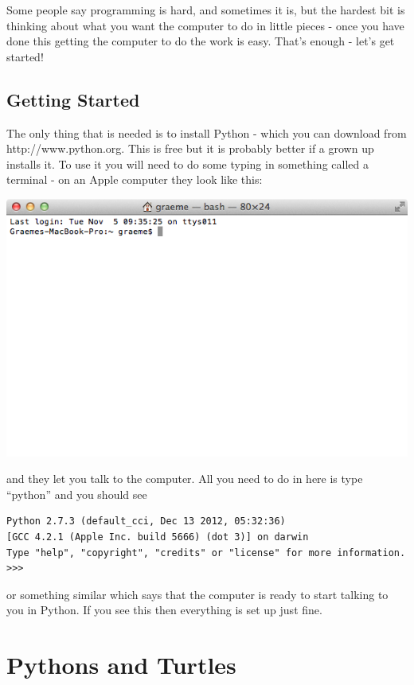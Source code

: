 \documentclass[a4paper, 11pt]{book}
\begin{document}
Some people say programming is hard, and sometimes it is, but the hardest bit is thinking about what you want the computer to do in little pieces - once you have done this getting the computer to do the work is easy. That's enough - let's get started!

\section{Getting Started}

The only thing that is needed is to install Python - which you can download from http://www.python.org. This is free but it is probably better if a grown up installs it. To use it you will need to do some typing in something called a terminal - on an Apple computer they look like this:

\includegraphics[scale=0.4]{terminal.png}

\noindent
and they let you talk to the computer. All you need to do in here is type ``python'' and you should see

{\small
\begin{verbatim}
Python 2.7.3 (default_cci, Dec 13 2012, 05:32:36) 
[GCC 4.2.1 (Apple Inc. build 5666) (dot 3)] on darwin
Type "help", "copyright", "credits" or "license" for more information.
>>> 
\end{verbatim}
}

\noindent 
or something similar which says that the computer is ready to start talking to you in Python. If you see this then everything is set up just fine.

\chapter{Pythons and Turtles}
\end{document}
